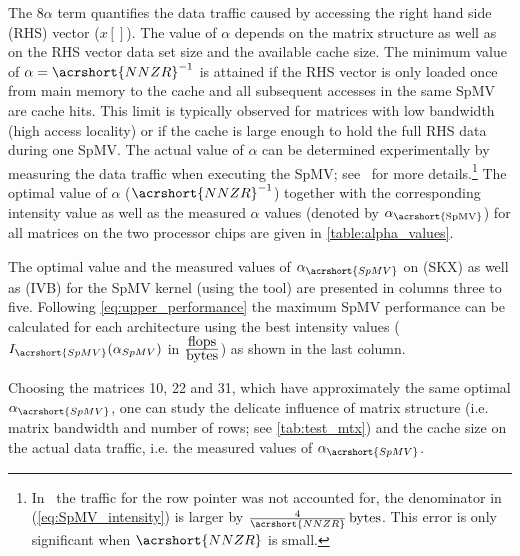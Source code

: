 The $8\alpha$ term quantifies the data traffic caused by accessing the right hand side (RHS) vector ($x[]$). The value of $\alpha$ depends on the matrix structure as well as on the RHS vector data set size and the available cache size. The minimum value of $\alpha=\acrshort{NNZR}^{-1}$ is attained if the RHS vector is only loaded once from main memory to the cache and all subsequent accesses in the same \acrshort{SpMV} are cache hits. This limit is typically observed for matrices with low bandwidth (high access locality) or if the cache is large enough to hold the full RHS data during one \acrshort{SpMV}. The actual value of $\alpha$ can be determined experimentally by measuring the data traffic when executing the \acrshort{SpMV}; see~\cite{Moritz_sell} for more details.\footnote{In~\cite{Moritz_sell} the traffic for the row pointer was not accounted for, \ie the denominator in (\ref{eq:SpMV_intensity}) is larger by $\frac{4}{\acrshort{NNZR}}\,\BYTE$. This error is only significant when $\acrshort{NNZR}$ is small.}  The optimal value of $\alpha$ ($\acrshort{NNZR}^{-1}$) together with the corresponding intensity value as well as the measured $\alpha$ values (denoted by $\alpha_\mathrm{\acrshort{SpMV}}$) for all matrices on the two processor chips are given in \cref{table:alpha_values}. 
\begin{table}[htbp]
	\footnotesize
	\caption{The optimal value and the measured values of $\alpha_{\acrshort{SpMV}}$ on \SKX (SKX) as well as \IVB (IVB) for the \acrshort{SpMV} kernel (using the \LIKWID tool) are presented in columns three to five. Following \cref{eq:upper_performance} the maximum \acrshort{SpMV} performance can be calculated for each architecture using the best intensity values  ($I_{\acrshort{SpMV}}(\alpha_{SpMV})$ in $\frac{\mbox{flops}}{\mbox{bytes}}$) as shown in the last column.}
	\label{table:alpha_values}
	\begin{center}
		
	\end{center}
\end{table}
 Choosing the matrices 10, 22 and 31, which have approximately the same optimal $\alpha_{\acrshort{SpMV}}$, one can study the delicate influence of matrix structure (i.e. matrix bandwidth and number of rows; see \cref{tab:test_mtx}) and the cache size on the actual data traffic, i.e. the measured values of $\alpha_{\acrshort{SpMV}}$.
 
 
